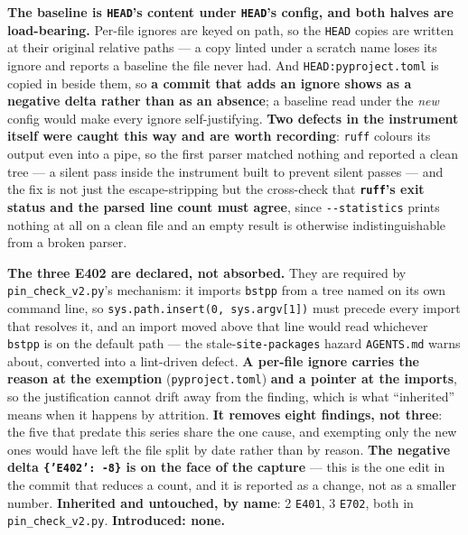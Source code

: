 \documentclass[
  10pt,
]{article}
\begin{document}
\textbf{The baseline is \texttt{HEAD}'s content under \texttt{HEAD}'s config, and both halves are load-bearing.} Per-file ignores are keyed on path, so the \texttt{HEAD} copies are written at their original relative paths --- a copy linted under a scratch name loses its ignore and reports a baseline the file never had. And \texttt{HEAD:pyproject.toml} is copied in beside them, so \textbf{a commit that adds an ignore shows as a negative delta rather than as an absence}; a baseline read under the \emph{new} config would make every ignore self-justifying. \textbf{Two defects in the instrument itself were caught this way and are worth recording}: \texttt{ruff} colours its output even into a pipe, so the first parser matched nothing and reported a clean tree --- a silent pass inside the instrument built to prevent silent passes --- and the fix is not just the escape-stripping but the cross-check that \textbf{\texttt{ruff}'s exit status and the parsed line count must agree}, since \texttt{-{}-statistics} prints nothing at all on a clean file and an empty result is otherwise indistinguishable from a broken parser.

\textbf{The three E402 are declared, not absorbed.} They are required by \texttt{pin\_check\_v2.py}'s mechanism: it imports \texttt{bstpp} from a tree named on its own command line, so \texttt{sys.path.insert(0, sys.argv[1])} must precede every import that resolves it, and an import moved above that line would read whichever \texttt{bstpp} is on the default path --- the stale-\texttt{site-packages} hazard \texttt{AGENTS.md} warns about, converted into a lint-driven defect. \textbf{A per-file ignore carries the reason at the exemption} (\texttt{pyproject.toml}) \textbf{and a pointer at the imports}, so the justification cannot drift away from the finding, which is what ``inherited'' means when it happens by attrition. \textbf{It removes eight findings, not three}: the five that predate this series share the one cause, and exempting only the new ones would have left the file split by date rather than by reason. \textbf{The negative delta \texttt{\{'E402': -8\}} is on the face of the capture} --- this is the one edit in the commit that reduces a count, and it is reported as a change, not as a smaller number. \textbf{Inherited and untouched, by name}: 2 \texttt{E401}, 3 \texttt{E702}, both in \texttt{pin\_check\_v2.py}. \textbf{Introduced: none.}
\end{document}
